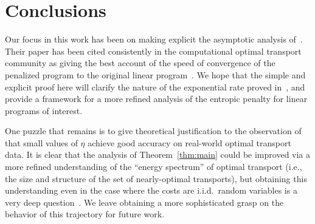 \documentclass[final,12pt]{colt2018}
\newcommand{\1}{\mathds{1}}
\begin{document}
\section{Conclusions}
Our focus in this work has been on making explicit the asymptotic analysis of~\citet{ComSan94}.
Their paper has been cited consistently in the computational optimal transport community as giving the best account of the speed of convergence of the penalized program to the original linear program~\citep[see][]{GenCutPey16,BenCarCut15,BenCarNen16,BloSegRol17,CarDuvPey17,DenPetSch14,DesPapRou16,Di-GerNen17,DiaRauRiv15,GenCutPey16,Sch16,PeyCut17,LuiRudPon18}.
We hope that the simple and explicit proof here will clarify the nature of the exponential rate proved in~\citet{ComSan94}, and provide a framework for a more refined analysis of the entropic penalty for linear programs of interest.

One puzzle that remains is to give theoretical justification to the observation of~\citet{Cut13} that small values of $\eta$ achieve good accuracy on real-world optimal transport data.
It is clear that the analysis of Theorem~\ref{thm:main} could be improved via a more refined understanding of the ``energy spectrum'' of optimal transport (i.e., the size and structure of the set of nearly-optimal transports), but obtaining this understanding even in the case where the costs are i.i.d.\ random variables is a very deep question~\citep{Ald01}. We leave obtaining a more sophisticated grasp on the behavior of this trajectory for future work.
\end{document}
